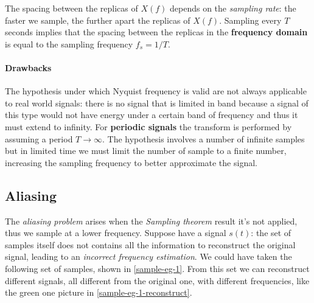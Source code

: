 \documentclass[10pt,a4paper]{report}
\theoremstyle{definition}
\begin{document}
The spacing between the replicas of $X(f)$ depends on the \textit{sampling rate}: the faster we sample, the further apart the replicas of $X(f)$. Sampling every $T$ seconds implies that the spacing between the replicas in the \textbf{frequency domain} is equal to the sampling frequency $f_{s} = 1/T$.
\paragraph{Drawbacks}\label{sec:drawbacks}
The hypothesis under which Nyquist frequency is valid are not always applicable to real world signals: there is no signal that is limited in band because a signal of this type would not have energy under a certain band of frequency and thus it must extend to infinity.
For \textbf{periodic signals} the transform is performed by assuming a period $T \rightarrow \infty$.
The hypothesis involves a number of infinite samples but in limited time we must limit the number of sample to a finite number, increasing the sampling frequency to better approximate the signal.
\subsection{Aliasing}\label{sec:aliasing}
The \textit{aliasing problem} arises when the \textit{Sampling theorem} result it's not applied, thus we sample at a lower frequency.
Suppose have a signal $s(t)$: the set of samples itself does not contains all the information to reconstruct the original signal, leading to an \textit{incorrect frequency estimation}.
We could have taken the following set of samples, shown in \ref{sample-eg-1}.
From this set we can reconstruct different signals, all different from the original one, with different frequencies, like the green one picture in \ref{sample-eg-1-reconstruct}.
\end{document}
